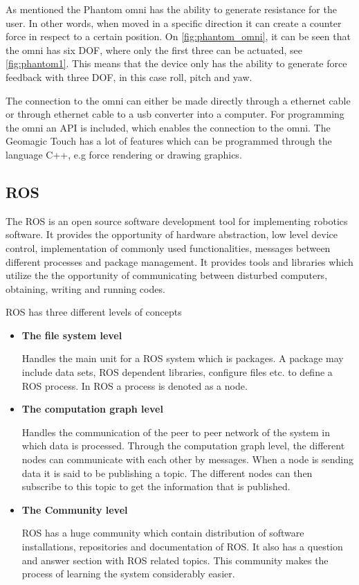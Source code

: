 \documentclass[conference]{IEEEtran}
\begin{document}
As mentioned the Phantom omni has the ability to generate resistance for the user. In other words, when moved in a specific direction it can create a counter force in respect to a certain position. On \ref{fig:phantom_omni}, it can be seen that the omni has six DOF, where only the first three can be actuated, see \ref{fig:phantom1}. This means that the device only has the ability to generate force feedback with three DOF, in this case roll, pitch and yaw.

The connection to the omni can either be made directly through a ethernet cable or through ethernet cable to a usb converter into a computer. For programming the omni an API is included, which enables the connection to the omni. The Geomagic Touch has a lot of features which can be programmed through the language C++, e.g force rendering or drawing graphics.

\subsection{ROS} 
The ROS is an open source software development tool for implementing robotics software. It provides the opportunity of hardware abstraction, low level device control, implementation of commonly used functionalities, messages between different processes and package management.%
 It provides tools and libraries which utilize the the opportunity of communicating between disturbed computers, obtaining, writing and running codes.
 
ROS has three different levels of concepts\cite{Wiki_ros_concepts}

\begin{itemize}
\item \textbf{The file system level}

Handles the main unit for a ROS system which is packages. A package may include data sets, ROS dependent libraries, configure files etc. to define a ROS process. In ROS a process is denoted as a node. 
\item \textbf{The computation graph level}

Handles the communication of the peer to peer network of the system in which data is processed. Through the computation graph level, the different nodes can communicate with each other by messages. When a node is sending data it is said to be publishing a topic. The different nodes can then subscribe to this topic to get the information that is published.
\item \textbf{The Community level}

ROS has a huge community which contain distribution of software installations, repositories and documentation of ROS. It also has a question and answer section with ROS related topics.
This community makes the process of learning the system considerably easier.
\end{itemize}
\end{document}
